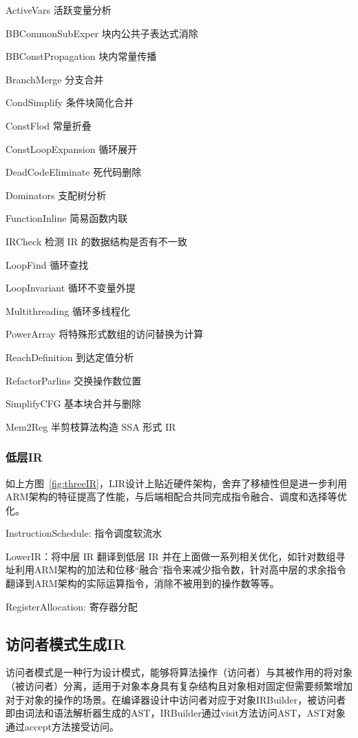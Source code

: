ActiveVars   活跃变量分析

BBCommonSubExper   块内公共子表达式消除

BBConstPropagation   块内常量传播

BranchMerge  分支合并

CondSimplify  条件块简化合并

ConstFlod  常量折叠

ConstLoopExpansion  循环展开

DeadCodeEliminate  死代码删除

Dominators  支配树分析

FunctionInline  简易函数内联

IRCheck  检测 IR 的数据结构是否有不一致

LoopFind  循环查找

LoopInvariant  循环不变量外提

Multithreading   循环多线程化

PowerArray  将特殊形式数组的访问替换为计算

ReachDefinition  到达定值分析

RefactorParlins  交换操作数位置

SimplifyCFG  基本块合并与删除

Mem2Reg  半剪枝算法构造 SSA 形式 IR


\subsubsection{低层IR}

如上方图~\ref{fig:threeIR}，LIR设计上贴近硬件架构，舍弃了移植性但是进一步利用ARM架构的特征提高了性能，与后端相配合共同完成指令融合、调度和选择等优化。

InstructionSchedule: 指令调度软流水

LowerIR：将中层 IR 翻译到低层 IR 并在上面做一系列相关优化，如针对数组寻址利用ARM架构的加法和位移“融合”指令来减少指令数，针对高中层的求余指令翻译到ARM架构的实际运算指令，消除不被用到的操作数等等。

RegisterAllocation: 寄存器分配

\subsection{访问者模式生成IR}

访问者模式是一种行为设计模式，能够将算法操作（访问者）与其被作用的将对象（被访问者）分离，适用于对象本身具有复杂结构且对象相对固定但需要频繁增加对于对象的操作的场景。在编译器设计中访问者对应于对象IRBuilder，被访问者即由词法和语法解析器生成的AST，IRBuilder通过visit方法访问AST，AST对象通过accept方法接受访问。 

